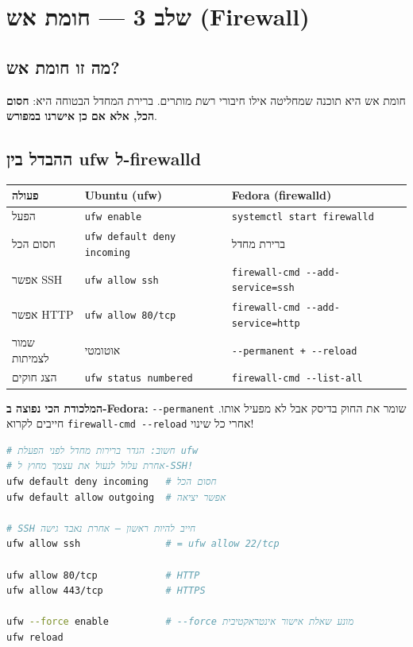 \documentclass[12pt,a4paper]{article}
\begin{document}
\newpage
\section{שלב 3 — חומת אש (Firewall)}

\subsection{מה זו חומת אש?}

חומת אש היא תוכנה שמחליטה אילו חיבורי רשת מותרים. ברירת המחדל הבטוחה היא: \textbf{חסום הכל, אלא אם כן אישרנו במפורש}.

\subsection{ההבדל בין ufw ל-firewalld}

\begin{center}
\begin{tabular}{lll}
\toprule
\textbf{פעולה} & \textbf{Ubuntu (ufw)} & \textbf{Fedora (firewalld)} \\
\midrule
הפעל & \texttt{ufw enable} & \texttt{systemctl start firewalld} \\
חסום הכל & \texttt{ufw default deny incoming} & ברירת מחדל \\
אפשר SSH & \texttt{ufw allow ssh} & \texttt{firewall-cmd -{}-add-service=ssh} \\
אפשר HTTP & \texttt{ufw allow 80/tcp} & \texttt{firewall-cmd -{}-add-service=http} \\
שמור לצמיתות & אוטומטי & \texttt{-{}-permanent + -{}-reload} \\
הצג חוקים & \texttt{ufw status numbered} & \texttt{firewall-cmd -{}-list-all} \\
\bottomrule
\end{tabular}
\end{center}

\begin{infobox}
\textbf{המלכודת הכי נפוצה ב-Fedora:} \texttt{-{}-permanent} שומר את החוק בדיסק אבל לא מפעיל אותו. חייבים לקרוא \texttt{firewall-cmd -{}-reload} אחרי כל שינוי!
\end{infobox}

\begin{lstlisting}[language=bash, caption={setup\_firewall.sh — Ubuntu}]
# חשוב: הגדר ברירות מחדל לפני הפעלת ufw
# אחרת עלול לנעול את עצמך מחוץ ל-SSH!
ufw default deny incoming   # חסום הכל
ufw default allow outgoing  # אפשר יציאה

# SSH חייב להיות ראשון — אחרת נאבד גישה
ufw allow ssh               # = ufw allow 22/tcp

ufw allow 80/tcp            # HTTP
ufw allow 443/tcp           # HTTPS

ufw --force enable          # --force מונע שאלת אישור אינטראקטיבית
ufw reload
\end{lstlisting}
\end{document}
